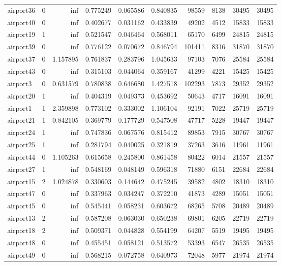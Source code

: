 \begin{longtable}{|l|r|r|r|r|r|r|r|r|r|}
airport36 & 0 & inf & 0.775249 & 0.065586 & 0.840835 & 98559 & 8138 & 30495 & 30495 \\
airport40 & 0 & inf & 0.402677 & 0.031162 & 0.433839 & 49202 & 4512 & 15833 & 15833 \\
airport19 & 1 & inf & 0.521547 & 0.046464 & 0.568011 & 65170 & 6499 & 24815 & 24815 \\
airport39 & 0 & inf & 0.776122 & 0.070672 & 0.846794 & 101411 & 8316 & 31870 & 31870 \\
airport37 & 0 & 1.157895 & 0.761837 & 0.283796 & 1.045633 & 97103 & 7076 & 25584 & 25584 \\
airport43 & 0 & inf & 0.315103 & 0.044064 & 0.359167 & 41299 & 4221 & 15425 & 15425 \\
airport3 & 0 & 0.631579 & 0.780838 & 0.646680 & 1.427518 & 102293 & 7873 & 29352 & 29352 \\
airport20 & 1 & inf & 0.404319 & 0.049373 & 0.453692 & 50643 & 4717 & 16091 & 16091 \\
airport1 & 1 & 2.359898 & 0.773102 & 0.333002 & 1.106104 & 92191 & 7022 & 25719 & 25719 \\
airport21 & 1 & 0.842105 & 0.369779 & 0.177729 & 0.547508 & 47717 & 5228 & 19447 & 19447 \\
airport24 & 1 & inf & 0.747836 & 0.067576 & 0.815412 & 89853 & 7915 & 30767 & 30767 \\
airport25 & 1 & inf & 0.281794 & 0.040025 & 0.321819 & 37263 & 3616 & 11961 & 11961 \\
airport44 & 0 & 1.105263 & 0.615658 & 0.245800 & 0.861458 & 80422 & 6014 & 21557 & 21557 \\
airport27 & 1 & inf & 0.548169 & 0.048149 & 0.596318 & 71880 & 6151 & 22684 & 22684 \\
airport15 & 2 & 1.024878 & 0.330603 & 0.144642 & 0.475245 & 39582 & 4802 & 18310 & 18310 \\
airport47 & 0 & inf & 0.337963 & 0.034247 & 0.372210 & 41873 & 4289 & 15051 & 15051 \\
airport45 & 0 & inf & 0.545441 & 0.058231 & 0.603672 & 68265 & 5708 & 20489 & 20489 \\
airport13 & 2 & inf & 0.587208 & 0.063030 & 0.650238 & 69801 & 6205 & 22719 & 22719 \\
airport18 & 2 & inf & 0.509371 & 0.044828 & 0.554199 & 64207 & 5519 & 19495 & 19495 \\
airport48 & 0 & inf & 0.455451 & 0.058121 & 0.513572 & 53393 & 6547 & 26535 & 26535 \\
airport49 & 0 & inf & 0.568215 & 0.072758 & 0.640973 & 72048 & 5977 & 21974 & 21974 \\

\end{longtable}
